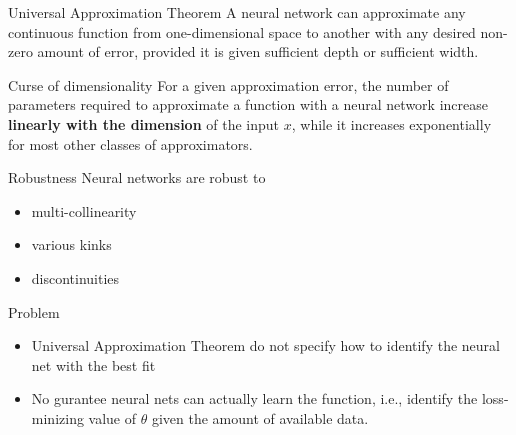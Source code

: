 \documentclass[aspectratio=169]{beamer} %
\begin{document}
\begin{frame}{Universal Approximation Theorem}
A neural network can approximate any continuous function from one-dimensional space to another with any desired non-zero amount of error, provided it is given sufficient depth or sufficient width.
    
\end{frame}

\begin{frame}{Curse of dimensionality}
For a given approximation error, the number of parameters required to approximate a function with a neural network increase \textbf{linearly with the dimension} of the input $x$, while it increases exponentially for most other classes of approximators.
    
\end{frame}
\begin{frame}{Robustness}
Neural networks are robust to
\begin{itemize}
    \item multi-collinearity
    \item various kinks
    \item discontinuities
\end{itemize}
    
\end{frame}

\begin{frame}{Problem}
\begin{itemize}
    \item Universal Approximation Theorem do not specify how to identify the neural net with the best fit
    \item No gurantee neural nets can actually learn the function, i.e., identify the loss-minizing value of $\theta$ given the amount of available data.
\end{itemize}
    
\end{frame}
\end{document}

